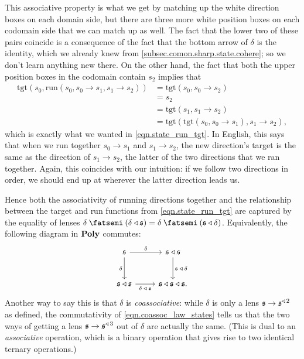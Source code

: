 \documentclass[Book-Poly]{subfiles}
\begin{document}
This associative property is what we get by matching up the white direction boxes on each domain side, but there are three more white position boxes on each codomain side that we can match up as well.
The fact that the lower two of these pairs coincide is a consequence of the fact that the bottom arrow of $\delta$ is the identity, which we already knew from \cref{subsec.comon.sharp.state.cohere}; so we don't learn anything new there.
On the other hand, the fact that both the upper position boxes in the codomain contain $s_2$ implies that
\begin{align*}
    \text{tgt}(s_0,\text{run}(s_0,s_0\to s_1,s_1\to s_2))&=\text{tgt}(s_0,s_0\to s_2)\\
    &=s_2\\
    &=\text{tgt}(s_1,s_1\to s_2)\\
    &=\text{tgt}(\text{tgt}(s_0,s_0\to s_1),s_1\to s_2),
\end{align*}
which is exactly what we wanted in \eqref{eqn.state_run_tgt}.
In English, this says that when we run together $s_0\to s_1$ and $s_1\to s_2$, the new direction's target is the same as the direction of $s_1\to s_2$, the latter of the two directions that we ran together.
Again, this coincides with our intuition: if we follow two directions in order, we should end up at wherever the latter direction leads us.

Hence both the associativity of running directions together and the relationship between the target and run functions from \eqref{eqn.state_run_tgt} are captured by the equality of lenses $\delta\then(\delta\tri\car{s})=\delta\then(\car{s}\tri\delta)$.
Equivalently, the following diagram in $\mathbf{Poly}$ commutes:
\begin{equation}\label{eqn.coassoc_law_states}
\begin{tikzcd}[row sep=large]
	\car{s}\ar[r, "\delta"]\ar[d, "\delta"']&
	\car{s}\tri\car{s}\ar[d, "\car{s}\:\tri\:\delta"]\\
	\car{s}\tri\car{s}\ar[r, "\delta\:\tri\:\car{s}"']&
	\car{s}\tri\car{s}\tri\car{s}.
\end{tikzcd}
\end{equation}
Another way to say this is that $\delta$ is \emph{coassociative}: while $\delta$ is only a lens $\mathfrak{s}\to\mathfrak{s}^{\mathbin{\triangleleft}\,2}$ as defined, the commutativity of \eqref{eqn.coassoc_law_states} tells us that the two ways of getting a lens $\mathfrak{s}\to\mathfrak{s}^{\mathbin{\triangleleft}\,3}$ out of $\delta$ are actually the same.
(This is dual to an \emph{associative} operation, which is a binary operation that gives rise to two identical ternary operations.)
\end{document}
